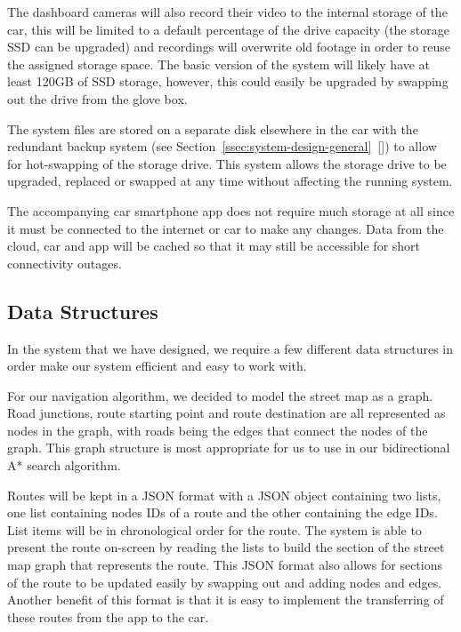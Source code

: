 \documentclass{article}
\begin{document}
The dashboard cameras will also record their video to the internal storage of the car, this will be limited to a default percentage of the drive capacity (the storage SSD can be upgraded) and recordings will overwrite old footage in order to reuse the assigned storage space. The basic version of the system will likely have at least 120GB of SSD storage, however, this could easily be upgraded by swapping out the drive from the glove box.

The system files are stored on a separate disk elsewhere in the car with the redundant backup system (see Section~\ref{ssec:system-design-general}~[]) to allow for hot-swapping of the storage drive. This system allows the storage drive to be upgraded, replaced or swapped at any time without affecting the running system. 

The accompanying car smartphone app does not require much storage at all since it must be connected to the internet or car to make any changes. Data from the cloud, car and app will be cached so that it may still be accessible for short connectivity outages.

\subsection{Data Structures}\label{ssec:data-structures} %
In the system that we have designed, we require a few different data structures in order make our system efficient and easy to work with.

For our navigation algorithm, we decided to model the street map as a graph. Road junctions, route starting point and route destination are all represented as nodes in the graph, with roads being the edges that connect the nodes of the graph. This graph structure is most appropriate for us to use in our bidirectional A* search algorithm.

Routes will be kept in a JSON format with a JSON object containing two lists, one list containing nodes IDs of a route and the other containing the edge IDs. List items will be in chronological order for the route. The system is able to present the route on-screen by reading the lists to build the section of the street map graph that represents the route. This JSON format also allows for sections of the route to be updated easily by swapping out and adding nodes and edges. Another benefit of this format is that it is easy to implement the transferring of these routes from the app to the car.
\end{document}
